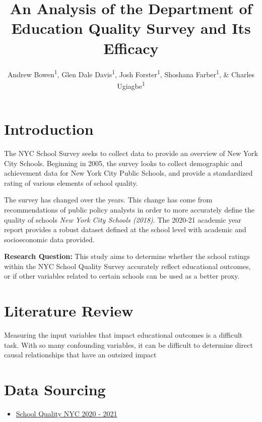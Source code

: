 \documentclass[
  man]{apa6}
\title{An Analysis of the Department of Education Quality Survey and Its Efficacy}
\author{Andrew Bowen\textsuperscript{1}, Glen Dale Davis\textsuperscript{1}, Josh Forster\textsuperscript{1}, Shoshana Farber\textsuperscript{1}, \& Charles Ugiagbe\textsuperscript{1}}
\date{}
\affiliation{\vspace{0.5cm}\textsuperscript{1} City University of New York}
\providecommand{\tightlist}{%
  \setlength{\itemsep}{0pt}\setlength{\parskip}{0pt}}
\begin{document}
\maketitle

\hypertarget{introduction}{%
\section{Introduction}\label{introduction}}

The NYC School Survey seeks to collect data to provide an overview of New York City Schools. Beginning in 2005, the survey looks to collect demographic and achievement data for New York City Public Schools, and provide a standardized rating of various elements of school quality.

The survey has changed over the years. This change has come from recommendations of public policy analysts in order to more accurately define the quality of schools \emph{New York City Schools (2018)}. The 2020-21 academic year report provides a robust dataset defined at the school level with academic and socioeconomic data provided.

\textbf{Research Question:} This study aims to determine whether the school ratings within the NYC School Quality Survey accurately reflect educational outcomes, or if other variables related to certain schools can be used as a better proxy.

\hypertarget{literature-review}{%
\section{Literature Review}\label{literature-review}}

Measuring the input variables that impact educational outcomes is a difficult task. With so many confounding variables, it can be difficult to determine direct causal relationships that have an outsized impact

\hypertarget{data-sourcing}{%
\section{Data Sourcing}\label{data-sourcing}}

\begin{itemize}
\tightlist
\item
  \href{https://data.cityofnewyork.us/Education/2020-2021-School-Quality-Reports-High-School/26je-vkp6}{School Quality NYC 2020 - 2021}
\end{itemize}
\end{document}
